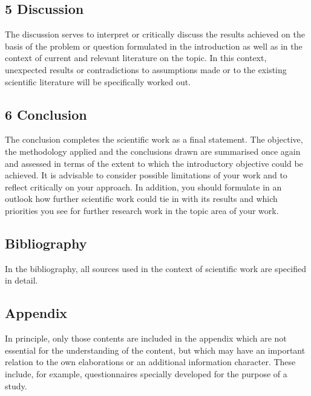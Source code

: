 \subsection*{5 Discussion}
The discussion serves to interpret or critically discuss the results achieved on the basis of the problem or question formulated in the introduction as well as in the context of current and relevant literature on the topic. In this context, unexpected results or contradictions to assumptions made or to the existing scientific literature will be specifically worked out.

\subsection*{6 Conclusion}
The conclusion completes the scientific work as a final statement. The objective, the methodology applied and the conclusions drawn are summarised once again and assessed in terms of the extent to which the introductory objective could be achieved. It is advisable to consider possible limitations of your work and to reflect critically on your approach. In addition, you should formulate in an outlook how further scientific work could tie in with its results and which priorities you see for further research work in the topic area of your work.

\subsection*{Bibliography}
In the bibliography, all sources used in the context of scientific work are specified in detail.

\subsection*{Appendix}
In principle, only those contents are included in the appendix which are not essential for the understanding of the content, but which may have an important relation to the own elaborations or an additional information character. These include, for example, questionnaires specially developed for the purpose of a study.

